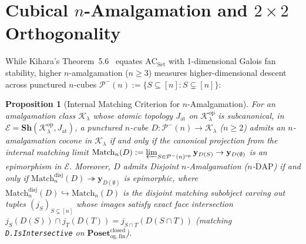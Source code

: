 \documentclass[10pt,twoside,openright]{book}
\theoremstyle{crmplain}
\newtheorem{proposition}[theorem]{Proposition}
\theoremstyle{crmdef}
\theoremstyle{crmremark}
\newcommand{\lean}[1]{\ignorespaces}
\newcommand{\leanwitness}{\ignorespaces}
\begin{document}
\section{\texorpdfstring{Cubical $n$-Amalgamation and $2 \times 2$ Orthogonality}{Cubical n-Amalgamation and 2x2 Orthogonality}}\label{subsec:cubical-amalgamation}

While Kihara's Theorem~5.6~\cite{Kihara26} equates $\mathrm{AC}_{\mathrm{Set}}$ with 1-dimensional Galois fan stability, higher $n$-amalgamation ($n \ge 3$) measures higher-dimensional descent across punctured $n$-cubes $\mathcal{P}^-(n) := \{S \subseteq [n] : S \subsetneq [n]\}$:

\begin{proposition}[Internal Matching Criterion for $n$-Amalgamation]\label{prop:matching-amalgamation}%
\lean{HomotopyCRM.PuncturedCube.card_eq, HomotopyCRM.hasCubicalNDAP_iff_isIntersective}%
\leanwitness%
%
For an amalgamation class $\mathcal{K}_\lambda$ whose atomic topology $J_{\mathrm{at}}$ on $\mathcal{K}_\lambda^{\mathrm{op}}$ is subcanonical, in $\mathcal{E} = \mathbf{Sh}(\mathcal{K}_\lambda^{\mathrm{op}}, J_{\mathrm{at}})$, a punctured $n$-cube $D : \mathcal{P}^-(n) \to \mathcal{K}_\lambda$ ($n \ge 2$) admits an $n$-amalgamation cocone in $\mathcal{K}_\lambda$ if and only if the canonical projection from the internal matching limit $\mathrm{Match}_n(D) :=\allowbreak \varprojlim_{S \in \mathcal{P}^-(n)^{\mathrm{op}}} \mathbf{y}_{D(S)} \to \mathbf{y}_{D(\emptyset)}$ is an epimorphism in $\mathcal{E}$. Moreover, $D$ admits Disjoint $n$-Amalgamation ($n$-$\mathrm{DAP}$) if and only if $\mathrm{Match}_n^{\mathrm{disj}}(D) \allowbreak\twoheadrightarrow \mathbf{y}_{D(\emptyset)}$ is epimorphic, where $\mathrm{Match}_n^{\mathrm{disj}}(D) \hookrightarrow \mathrm{Match}_n(D)$ is the disjoint matching subobject carving out tuples $(j_S)_{S \subsetneq [n]}$ whose images satisfy exact face intersection $j_S(D(S)) \cap \allowbreak j_T(D(T)) = \allowbreak j_{S \cap T}(D(S \cap T))$ (matching \texttt{D.\allowbreak Is\allowbreak Intersective} on $\mathbf{Poset}_{\mathrm{og,fin}}^{\mathrm{closed}}$).
\end{proposition}
\end{document}
